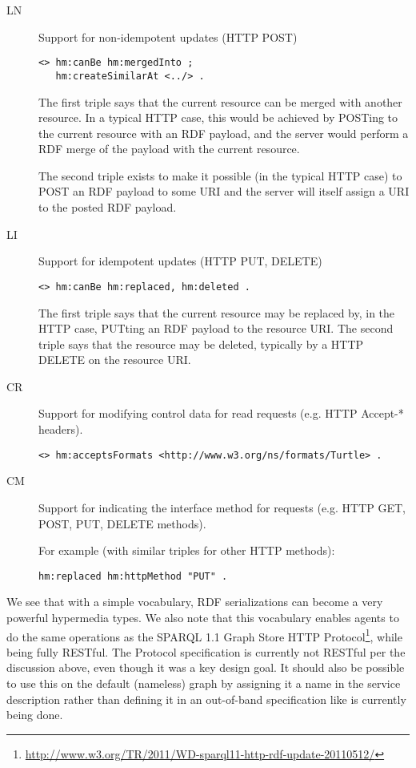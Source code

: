 \documentclass{llncs}
\begin{document}
\begin{description}

\item[\textsf{LN}] Support for non-idempotent updates (HTTP POST) 

\begin{verbatim}
<> hm:canBe hm:mergedInto ;
   hm:createSimilarAt <../> .
\end{verbatim}

The first triple says that the current resource can be merged with
another resource. In a typical HTTP case, this would be achieved by
POSTing to the current resource with an RDF payload, and the server
would perform a RDF merge of the payload with the current resource.

The second triple exists to make it possible (in the typical HTTP
case) to POST an RDF payload to some URI and the server will itself
assign a URI to the posted RDF payload. 


\item[\textsf{LI}] Support for idempotent updates (HTTP PUT, DELETE) 

\begin{verbatim}
<> hm:canBe hm:replaced, hm:deleted .
\end{verbatim}

The first triple says that the current resource may be replaced by, in
the HTTP case, PUTting an RDF payload to the resource URI. The second
triple says that the resource may be deleted, typically by a HTTP
DELETE on the resource URI.


\item[\textsf{CR}] Support for modifying control data for read requests
  (e.g. HTTP Accept-* headers).

\begin{verbatim}
<> hm:acceptsFormats <http://www.w3.org/ns/formats/Turtle> .
\end{verbatim}

\item[\textsf{CM}] Support for indicating the interface method for requests
  (e.g. HTTP GET, POST, PUT, DELETE methods).

For example (with similar triples for other HTTP methods):
\begin{verbatim}
hm:replaced hm:httpMethod "PUT" .
\end{verbatim}

\end{description}

We see that with a simple vocabulary, RDF serializations can become a
very powerful hypermedia types. We also note that this vocabulary
enables agents to do the same operations as the SPARQL 1.1 Graph Store
HTTP
Protocol\footnote{\url{http://www.w3.org/TR/2011/WD-sparql11-http-rdf-update-20110512/}},
while being fully RESTful. The Protocol specification is currently not RESTful
per the discussion above, even though it was a key design goal. It
should also be possible to use this on the default (nameless) graph by
assigning it a name in the service description rather than defining it
in an out-of-band specification like is currently being done.
\end{document}
